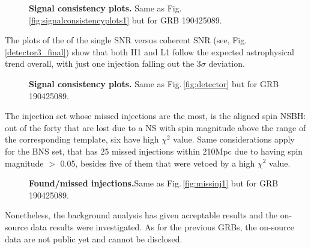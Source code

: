 \documentclass[binding=0.6cm, LaM]{sapthesis}
\begin{document}
\begin{figure}[!t]
                        \centering
                        \caption{\textbf{Signal consistency plots.} Same as Fig.\,\ref{fig:signalconsistencyplots1} but for GRB 190425089.}
                        \label{fig:signalconsistencyplots3_final}
                \end{figure}
	The plots of the of the single SNR versus coherent SNR (see, Fig.\ref{detector3_final}) show that both H1 and L1
	follow the expected astrophysical trend overall, with just one  injection falling out the  3$\sigma$ deviation.
	                \begin{figure}[!t]
                        \noindent
                        \label{detector3_final}
                        \centering
                        \caption{\textbf{Signal consistency plots.} Same as Fig.\,\ref{fig:detector} but for GRB 190425089.}
                        \label{fig:detector3_final}
                \end{figure}
	
        The injection set whose missed injections are the most, is the aligned spin NSBH:
        out of the forty that are lost due to a NS  with  spin magnitude above the range of the corresponding template,
        six have high $\chi^2$ value.
        Same considerations apply for the BNS set, that has 25 missed injections within 210Mpc due to having spin magnitude $>$ 0.05,
        besides five of  them that were vetoed by a high $\chi^2$ value.
                \begin{figure}[h]
                        \noindent
                        \label{missinj3_5}
                        \centering
                        \caption{\textbf{Found/missed injections.}Same as Fig.\,\ref{fig:missinj1} but for GRB 190425089.}
                        \label{fig:missinj3_5}
                \end{figure}
	Nonetheless, the background analysis has given acceptable results
	and the on-source data results were investigated. 
	As for the previous GRBs, the on-source data are not public yet and cannot be disclosed. 
\end{document}
